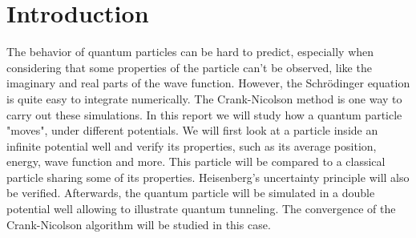 \section{Introduction}

The behavior of quantum particles can be hard to predict, especially when considering that some properties of the particle can't be observed, like the imaginary and real parts of the wave function. However, the Schrödinger equation is quite easy to integrate numerically. The Crank-Nicolson method is one way to carry out these simulations. In this report we will study how a quantum particle "moves", under different potentials. We will first look at a particle inside an infinite potential well and verify its properties, such as its average position, energy, wave function and more. This particle will be compared to a classical particle sharing some of its properties. Heisenberg's uncertainty principle will also be verified. Afterwards, the quantum particle will be simulated in a double potential well allowing to illustrate quantum tunneling. The convergence of the Crank-Nicolson algorithm will be studied in this case.
